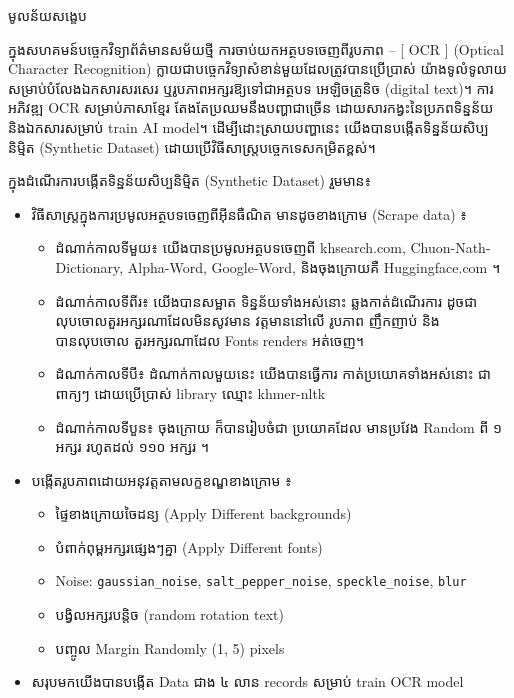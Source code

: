 \begin{adjustwidth}{0.2cm}{0.2cm}

    \begin{center}
        {\khmerfont\fontsize{15pt}{25pt}\selectfont មូលន័យសង្ខេប \par}
    \end{center}
    \label{khmer-abstract}
    \vspace{0.5cm}
    \khmernormal
    \small
    ក្នុងសហគមន៍បច្ចេកវិទ្យាព័ត៌មានសម័យថ្មី ការចាប់យកអត្ថបទចេញពីរូបភាព  – [ OCR ]
    (Optical Character Recognition) ក្លាយជាបច្ចេកវិទ្យាសំខាន់មួយដែលត្រូវបានប្រើប្រាស់
    យ៉ាងទូលំទូលាយ សម្រាប់បំលែងឯកសារសរសេរ ឬរូបភាពអក្សរឱ្យទៅជាអត្ថបទ អេឡិចត្រូនិច (digital text)។ 
    ការអភិវឌ្ឍ OCR សម្រាប់ភាសាខ្មែរ តែងតែប្រឈមនឹងបញ្ហាជាច្រើន ដោយសារកង្វះនៃប្រភពទិន្នន័យ 
    និងឯកសារសម្រាប់ train AI model។ ដើម្បីដោះស្រាយបញ្ហានេះ យើងបានបង្កើតទិន្នន័យសិប្បនិម្មិត 
    (Synthetic Dataset) ដោយប្រើវិធីសាស្ត្របច្ចេកទេសកម្រិតខ្ពស់។\par
    
    ក្នុងដំណើរការបង្កើតទិន្នន័យសិប្បនិម្មិត (Synthetic Dataset) រួមមាន៖
    \begin{itemize}
        \item វិធីសាស្ដ្រក្នុងការប្រមូលអត្ថបទចេញពីអ៊ីនធឺណិត មានដូចខាងក្រោម (Scrape data) ៖
        \begin{itemize}
            \item ដំណាក់កាលទីមួយ៖ យើងបានប្រមូលអត្ថបទចេញពី khsearch.com, Chuon-Nath-Dictionary, Alpha-Word, Google-Word, និងចុងក្រោយគឺ Huggingface.com ។
            \item ដំណាក់កាលទីពីរ៖ យើងបានសម្អាត ទិន្នន័យទាំងអស់នោះ ឆ្លងកាត់ដំណើរការ ដូចជា លុបចោលតួរអក្សរណាដែលមិនសូវមាន វត្តមាននៅលើ រូបភាព ញឹកញាប់ និងបានលុបចោល តួរអក្សរណាដែល Fonts renders អត់ចេញ។
            \item ដំណាក់កាលទីបី៖ ដំណាក់កាលមួយនេះ យើងបានធ្វើការ កាត់ប្រយោគទាំងអស់នោះ ជាពាក្យៗ ដោយប្រើប្រាស់ library ឈ្មោះ khmer-nltk
            \item ដំណាក់កាលទីបួន៖ ចុងក្រោយ ក៏បានរៀបចំជា ប្រយោគដែល មានប្រវែង Random ពី ១ អក្សរ រហូតដល់ ១១០ អក្សរ ។
        \end{itemize}
        \item បង្កើតរូបភាពដោយអនុវត្តតាមលក្ខខណ្ឌខាងក្រោម ៖ 
        \begin{itemize}
            \item ផ្ទៃខាងក្រោយចៃដន្យ (Apply Different backgrounds)
            \item បំពាក់ពុម្ពអក្សរផ្សេងៗគ្នា (Apply Different fonts)
            \item Noise: \texttt{gaussian\_noise}, \texttt{salt\_pepper\_noise}, \texttt{speckle\_noise}, \texttt{blur}
            \item បង្វិលអក្សរបន្តិច (random rotation text)
            \item បញ្ចូល Margin Randomly (1, 5) pixels
        \end{itemize}
        \item សរុបមកយើងបានបង្កើត Data ជាង ៤ លាន records សម្រាប់ train OCR model
    \end{itemize}
    \par
    

\end{adjustwidth}
